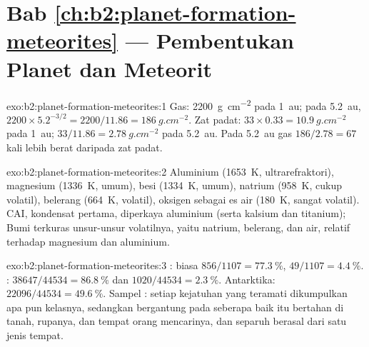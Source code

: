 \section*{Bab \ref{ch:b2:planet-formation-meteorites} --- Pembentukan Planet dan Meteorit}

\begin{solution}{exo:b2:planet-formation-meteorites:1}
Gas: \qty{2200}{g.cm^{-2}} pada \qty{1}{au}; pada \qty{5.2}{au},
$2200\times5.2^{-3/2} = 2200/11.86 = \qty{186}{g.cm^{-2}}$. Zat padat:
$33\times0.33 = \qty{10.9}{g.cm^{-2}}$ pada \qty{1}{au};
$33/11.86 = \qty{2.78}{g.cm^{-2}}$ pada \qty{5.2}{au}. Pada \qty{5.2}{au} gas
$186/2.78 = 67$ kali lebih berat daripada zat padat.
\end{solution}

\begin{solution}{exo:b2:planet-formation-meteorites:2}
Aluminium (\qty{1653}{K}, ultrarefraktori), magnesium (\qty{1336}{K}, umum),
besi (\qty{1334}{K}, umum), natrium (\qty{958}{K}, cukup volatil), belerang
(\qty{664}{K}, volatil), oksigen sebagai es air (\qty{180}{K}, sangat volatil).
CAI, kondensat pertama, diperkaya aluminium (serta kalsium dan titanium);
Bumi terkuras unsur-unsur volatilnya, yaitu natrium, belerang, dan air, relatif terhadap
magnesium dan aluminium.
\end{solution}

\begin{solution}{exo:b2:planet-formation-meteorites:3}
:  biasa $856/1107 = \qty{77.3}{\percent}$, 
$49/1107 = \qty{4.4}{\percent}$. : $38647/44534 = \qty{86.8}{\percent}$ dan
$1020/44534 = \qty{2.3}{\percent}$.  Antarktika: $22096/44534 =
\qty{49.6}{\percent}$. Sampel : setiap kejatuhan yang teramati dikumpulkan apa pun
kelasnya, sedangkan  bergantung pada seberapa baik  itu bertahan di tanah,
rupanya, dan tempat orang mencarinya, dan separuh  berasal dari satu jenis
tempat.
\end{solution}

